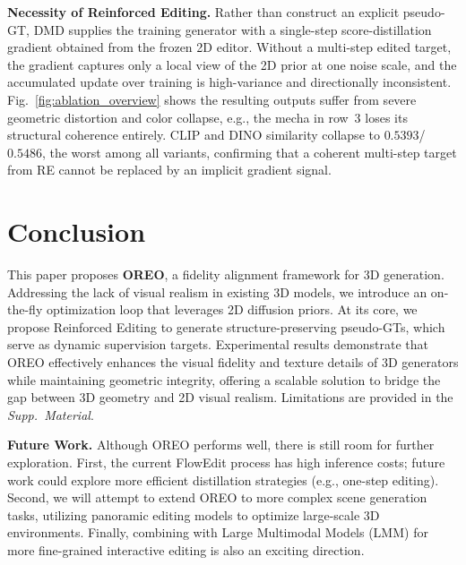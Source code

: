 \documentclass[runningheads]{llncs}
\begin{document}
\textbf{Necessity of Reinforced Editing.} Rather than construct an explicit pseudo-GT, DMD supplies the training generator with a single-step score-distillation gradient obtained from the frozen 2D editor. Without a multi-step edited target, the gradient captures only a local view of the 2D prior at one noise scale, and the accumulated update over training is high-variance and directionally inconsistent. Fig.~\ref{fig:ablation_overview} shows the resulting outputs suffer from severe geometric distortion and color collapse, e.g., the mecha in row~3 loses its structural coherence entirely. CLIP and DINO similarity collapse to $0.5393$/$0.5486$, the worst among all variants, confirming that a coherent multi-step target from RE cannot be replaced by an implicit gradient signal.

\section{Conclusion}
This paper proposes \textbf{OREO}, a fidelity alignment framework for 3D generation.
Addressing the lack of visual realism in existing 3D models, we introduce an on-the-fly optimization loop that leverages 2D diffusion priors.
At its core, we propose Reinforced Editing to generate structure-preserving pseudo-GTs, which serve as dynamic supervision targets.
Experimental results demonstrate that OREO effectively enhances the visual fidelity and texture details of 3D generators while maintaining geometric integrity, offering a scalable solution to bridge the gap between 3D geometry and 2D visual realism. Limitations are provided in the \emph{Supp.\ Material}.

\textbf{Future Work.} Although OREO performs well, there is still room for further exploration. First, the current FlowEdit process has high inference costs; future work could explore more efficient distillation strategies (e.g., one-step editing). Second, we will attempt to extend OREO to more complex scene generation tasks, utilizing panoramic editing models to optimize large-scale 3D environments. Finally, combining with Large Multimodal Models (LMM) for more fine-grained interactive editing is also an exciting direction.

\clearpage



\end{document}
